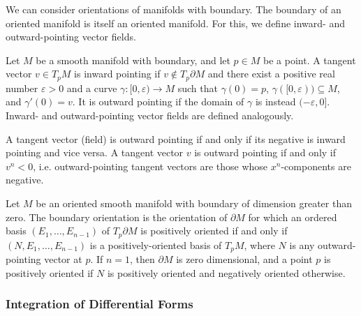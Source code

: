 \documentclass[a4paper,12pt]{article}
\begin{document}
We can consider orientations of manifolds with boundary.
The boundary of an oriented manifold is itself an oriented manifold.
For this, we define inward- and outward-pointing vector fields.
\begin{definition}\label{def:inward-_and_outward-pointing_vector_fields}
    Let $M$ be a smooth manifold with boundary, and let $p \in M$ be a point.
    A tangent vector $v \in T_p M$ is inward pointing if $v \notin T_p \partial M$ and there exist a positive real number $\varepsilon > 0$ and a curve $\gamma \colon [0, \varepsilon) \to M$ such that $\gamma(0) = p$, $\gamma([0, \varepsilon)) \subseteq M$, and $\gamma'(0) = v$.
    It is outward pointing if the domain of $\gamma$ is instead $(-\varepsilon, 0]$.
    Inward- and outward-pointing vector fields are defined analogously.
\end{definition}
\begin{remark}
    A tangent vector (field) is outward pointing if and only if its negative is inward pointing and vice versa.
    A tangent vector $v$ is outward pointing if and only if $v^n < 0$, i.e. outward-pointing tangent vectors are those whose $x^n$-components are negative.
\end{remark}
\begin{definition}\label{def:boundary_orientation}
    Let $M$ be an oriented smooth manifold with boundary of dimension greater than zero.
    The boundary orientation is the orientation of $\partial M$ for which an ordered basis $(E_1, \ldots, E_{n-1})$ of $T_p \partial M$ is positively oriented if and only if $(N, E_1, \ldots, E_{n-1})$ is a positively-oriented basis of $T_p M$, where $N$ is any outward-pointing vector at $p$.
    If $n = 1$, then $\partial M$ is zero dimensional, and a point $p$ is positively oriented if $N$ is positively oriented and negatively oriented otherwise.
\end{definition}

\subsubsection{Integration of Differential Forms}\label{subsubsec:differential_forms:integration_on_manifolds:integration_of_differential_forms}
\end{document}
